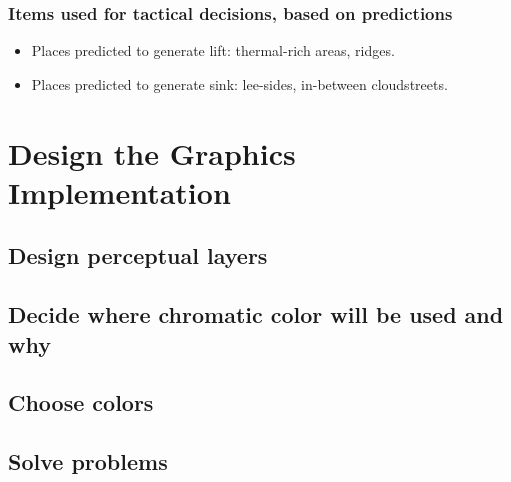 \documentclass{article}
\begin{document}
\subsubsection{Items used for tactical decisions, based on predictions}
\begin{itemize}
\item Places predicted to generate lift: thermal-rich areas, ridges.
\item Places predicted to generate sink: lee-sides, in-between cloudstreets.
\end{itemize}

\section{Design the Graphics Implementation}
\subsection{Design perceptual layers}
\subsection{Decide where chromatic color will be used and why}
\subsection{Choose colors}
\subsection{Solve problems}
\end{document}
